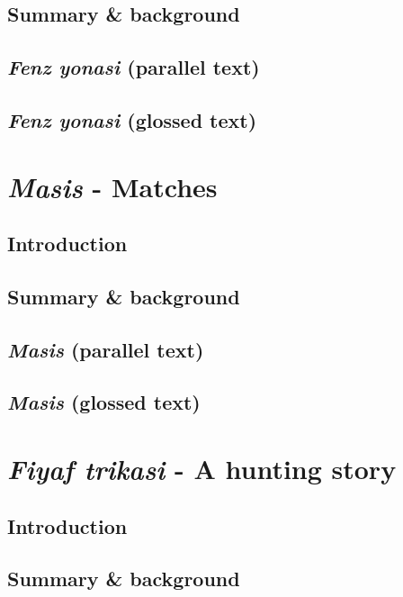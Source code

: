 \documentclass[output=book,
		  ]{langscibook}
\begin{document}
\section{Summary \& background}
    
\section{\textit{Fenz yonasi} (parallel text)}
    
    \newpage
\section{\textit{Fenz yonasi} (glossed text)}
    

\chapter{\textit{Masis} - Matches}\label{text:masis}
    \vspace{-.4cm}
    \section{Introduction}

    \vspace{-.4cm}
\section{Summary \& background}
    
\section{\textit{Masis} (parallel text)}
    
    \newpage
\section{\textit{Masis} (glossed text)}
    

\chapter{\textit{Fiyaf trikasi} - A hunting story}\label{text:fiyaf-lucy}
\section{Introduction}
    
\section{Summary \& background}
    
\end{document}

